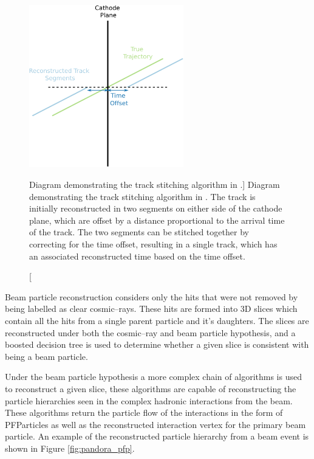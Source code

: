 \begin{figure}
	\centering
	\includegraphics[width=0.6\textwidth]{figures/track_stitch.pdf}
	\caption
	[Diagram demonstrating the track stitching algorithm in \protodune{}.]
	{Diagram demonstrating the track stitching algorithm in \protodune{}. The
	track is initially reconstructed in two segments on either side of the cathode
	plane, which are offset by a distance proportional to the arrival time of the
	track. The two segments can be stitched together by correcting for the time
	offset, resulting in a single track, which has an associated reconstructed
	time based on the time offset.}
	\label{fig:track_stitching}
\end{figure}

Beam particle reconstruction considers only the hits that were not removed by 
being labelled as clear cosmic--rays. These hits are formed into 3D slices which
contain all the hits from a single parent particle and it's daughters. The
slices are reconstructed under both the cosmic--ray and beam particle
hypothesis, and a boosted decision tree is used to determine whether a 
given slice is consistent with being a beam particle\cite{protoduneperf}. 

Under the beam particle hypothesis a more complex chain of algorithms is used to
reconstruct a given slice, these algorithms are capable of reconstructing the
particle hierarchies seen in the complex hadronic interactions from the
\protodune{} beam. These algorithms return the particle flow of the interactions
in the form of PFParticles as well as the reconstructed interaction vertex for
the primary beam particle. An example of the reconstructed particle hierarchy
from a \protodune{} beam event is shown in Figure \ref{fig:pandora_pfp}.

